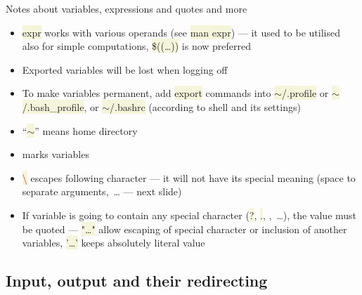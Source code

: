 \documentclass[compress, ucs, xelatex, 11pt, xcolor=svgnames, aspectratio=169,
	hyperref={
		bookmarks=true,
		unicode=true,
		colorlinks=true,
		pdftitle={Linux, command line and MetaCentrum},
		plainpages=false,
		pdfauthor={Vojtech Zeisek},
		pdfsubject={Course about use of Linux command line, writing shell scripts and using MetaCentrum of CESNET},
		pdfcreator={XeLaTeX},
		pdfkeywords={Linux, GNU, BASH, shell, command line, MetaCentrum},
		linkcolor=DarkRed, %
		anchorcolor=DarkBlue, %
		citecolor=Indigo, %
		filecolor=NavyBlue, %
		menucolor=DarkMagenta, %
		urlcolor=DarkBlue, %
		pdftex},
	url={hyphens, lowtilde} %
	]{beamer}
\renewcommand{\texttt}[1]{\colorbox{Beige}{{\ttfamily #1}}}
\renewcommand{\alert}[1]{\textcolor{red}{#1}}
\begin{document}
\begin{frame}{Notes about variables, expressions and quotes and more}
	\label{varquotes}
	\begin{itemize}
		\item \texttt{expr} works with various operands (see \texttt{man expr}) --- it used to be utilised also for simple computations, \texttt{\$((\ldots))} is now preferred
		\item Exported variables will be lost when logging off
		\item To make variables permanent, add \texttt{export} commands into \texttt{$\sim$/.profile} or \texttt{$\sim$/.bash\_profile}, or \texttt{$\sim$/.bashrc} (according to shell and its settings)
		\item \enquote{\texttt{$\sim$}} means home directory
		\item \alert{\texttt{\textdollar}} marks variables
		\item \alert{\texttt{\textbackslash}} escapes following character --- it will not have its special meaning (space to separate arguments,~\ldots{ }--- next slide)
		\item If variable is going to contain any special character (\texttt{?}, \texttt{.}, \texttt{*},~\ldots), the value must be quoted --- \texttt{"\ldots"} allow escaping of special character or inclusion of another variables, \texttt{'\ldots'} keeps absolutely literal value
	\end{itemize}
\end{frame}

%     

\subsection[Chaining]{Input, output and their redirecting}
\end{document}
